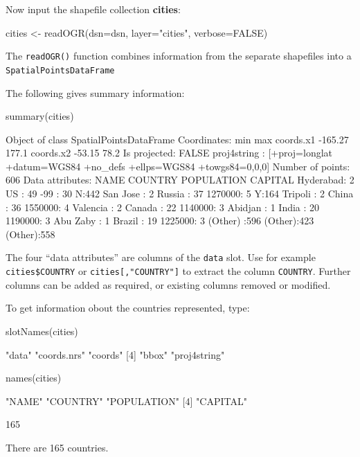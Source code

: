 \documentclass{tufte-book}\usepackage[]{graphicx}\usepackage[]{color}
\newcommand{\txtt}[1]{\texttt{#1}}
\begin{document}
{Now input the shapefile collection {\bf cities}:
\begin{Schunk}
\begin{Sinput}
cities <- readOGR(dsn=dsn, layer="cities", verbose=FALSE)
\end{Sinput}
\end{Schunk}
\noindent
The \txtt{readOGR()} function combines information from the separate
shapefiles into a \txtt{SpatialPointsDataFrame}

The following gives summary information:
\begin{Schunk}
\begin{Sinput}
summary(cities)
\end{Sinput}
\begin{Soutput}
Object of class SpatialPointsDataFrame
Coordinates:
              min   max
coords.x1 -165.27 177.1
coords.x2  -53.15  78.2
Is projected: FALSE 
proj4string :
[+proj=longlat +datum=WGS84 +no_defs
+ellps=WGS84 +towgs84=0,0,0]
Number of points: 606
Data attributes:
        NAME        COUNTRY      POPULATION  CAPITAL
 Hyderabad:  2   US     : 49   -99    : 30   N:442  
 San Jose :  2   Russia : 37   1270000:  5   Y:164  
 Tripoli  :  2   China  : 36   1550000:  4          
 Valencia :  2   Canada : 22   1140000:  3          
 Abidjan  :  1   India  : 20   1190000:  3          
 Abu Zaby :  1   Brazil : 19   1225000:  3          
 (Other)  :596   (Other):423   (Other):558          
\end{Soutput}
\end{Schunk}
\noindent
The four ``data attributes'' are columns of the \txtt{data} slot.  Use
for example \txtt{cities\$COUNTRY} or \txtt{cities[,"COUNTRY"]} to
extract the column \txtt{COUNTRY}.    Further
columns can be added as required, or existing columns removed or
modified.

To get information obout the countries represented, type:
\begin{Schunk}
\begin{Sinput}
slotNames(cities)
\end{Sinput}
\begin{Soutput}
[1] "data"        "coords.nrs"  "coords"     
[4] "bbox"        "proj4string"
\end{Soutput}
\begin{Sinput}
names(cities)
\end{Sinput}
\begin{Soutput}
[1] "NAME"       "COUNTRY"    "POPULATION"
[4] "CAPITAL"   
\end{Soutput}
\begin{Soutput}
[1] 165
\end{Soutput}
\end{Schunk}
\noindent
There are 165 countries.

}
\end{document}
